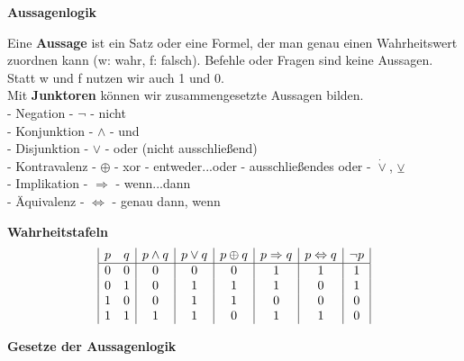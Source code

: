 \documentclass[a4paper]{article}
\begin{document}
\parindent 0mm

\textbf{Aussagenlogik}
\bigskip

Eine \textbf{Aussage} ist ein Satz oder eine Formel, der man genau einen Wahrheitswert zuordnen kann (w: wahr, f: falsch). Befehle oder Fragen sind keine Aussagen. \\
Statt w und f nutzen wir auch 1 und 0. \\

Mit \textbf{Junktoren}  können wir zusammengesetzte Aussagen bilden. \\

- Negation - $\lnot$ - nicht \\
- Konjunktion - $\land$ - und \\
- Disjunktion - $\lor$ - oder (nicht ausschließend) \\
- Kontravalenz - $\oplus$ - xor - entweder...oder - ausschließendes oder - $\dot \lor$, $\veebar$ \\
- Implikation -  $\Rightarrow$ - wenn...dann  \\
- Äquivalenz - $\Leftrightarrow$ - genau dann, wenn  \\
 

\bigskip

\textbf{Wahrheitstafeln} 
\bigskip 
\begin{displaymath}
\begin{array}{|c c|c|c|c|c|c|c|}

p & q & p \land q & p \lor q & p \oplus q & p \Rightarrow q & p \Leftrightarrow q & \lnot p\\ 
\hline  
0 & 0 & 0 & 0 & 0 & 1 & 1 & 1\\
0 & 1 & 0 & 1 & 1 & 1 & 0 & 1\\
1 & 0 & 0 & 1 & 1 & 0 & 0 & 0\\
1 & 1 & 1 & 1 & 0 & 1 & 1 & 0\\
\end{array}
\end{displaymath}

\textbf{Gesetze der Aussagenlogik} 
\bigskip 
\end{document}
